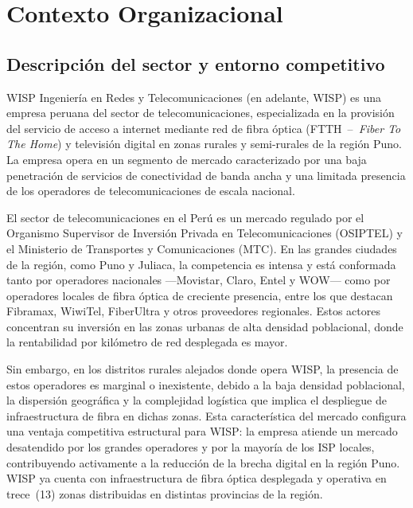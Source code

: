 \section{Contexto Organizacional}
\label{sec:contexto}

\subsection{Descripción del sector y entorno competitivo}

WISP Ingeniería en Redes y Telecomunicaciones (en adelante, WISP) es una empresa
peruana del sector de telecomunicaciones, especializada en la provisión del
servicio de acceso a internet mediante red de fibra óptica (FTTH~--~\textit{Fiber
To The Home}) y televisión digital en zonas rurales y semi-rurales de la región
Puno. La empresa opera en un segmento de mercado caracterizado por una baja
penetración de servicios de conectividad de banda ancha y una limitada presencia
de los operadores de telecomunicaciones de escala nacional.

El sector de telecomunicaciones en el Perú es un mercado regulado por el
Organismo Supervisor de Inversión Privada en Telecomunicaciones (OSIPTEL) y el
Ministerio de Transportes y Comunicaciones (MTC). En las grandes ciudades de la
región, como Puno y Juliaca, la competencia es intensa y está conformada tanto
por operadores nacionales ---Movistar, Claro, Entel y WOW--- como por operadores
locales de fibra óptica de creciente presencia, entre los que destacan Fibramax,
WiwiTel, FiberUltra y otros proveedores regionales. Estos actores concentran su
inversión en las zonas urbanas de alta densidad poblacional, donde la
rentabilidad por kilómetro de red desplegada es mayor.

Sin embargo, en los distritos rurales alejados donde opera WISP, la presencia de
estos operadores es marginal o inexistente, debido a la baja densidad
poblacional, la dispersión geográfica y la complejidad logística que implica el
despliegue de infraestructura de fibra en dichas zonas. Esta característica del
mercado configura una ventaja competitiva estructural para WISP: la empresa
atiende un mercado desatendido por los grandes operadores y por la mayoría de los
ISP locales, contribuyendo activamente a la reducción de la brecha digital en la
región Puno. WISP ya cuenta con infraestructura de fibra óptica desplegada y
operativa en trece~(13) zonas distribuidas en distintas provincias de la región.


